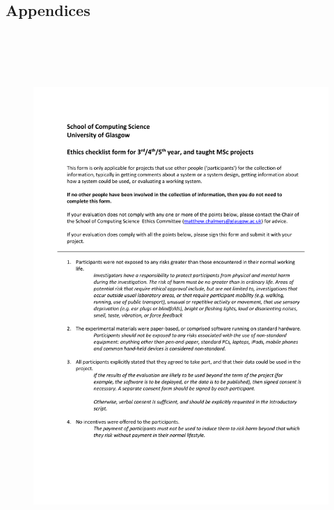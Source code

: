 \documentclass{l4proj}
\begin{document}
%
% 

\begin{appendices}

\chapter{Appendices}

\begin{figure}[h]
    \centering
    \includegraphics[height=20cm]{images/Media_515048_smxx-1.png}
\end{figure}


\end{appendices}
\end{document}
